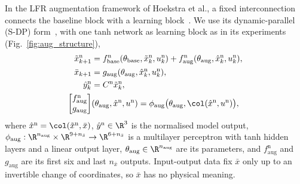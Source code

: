 In the LFR augmentation framework of Hoekstra et al., a fixed interconnection
connects the baseline block with a learning
block~\cite[Sec.~3.2]{hoekstra2025lfr}.
We use its dynamic-parallel (S-DP) form~\cite[Table~1]{hoekstra2026lfr}, with
one tanh network as learning block as in its
experiments~\cite[Sec.~6.3]{hoekstra2026lfr} (Fig.~\ref{fig:aug_structure}),
\begin{equation}
\begin{aligned}
 \tilde x^{\mathrm n}_{k+1}
 &=f^{\mathrm n}_{\mathrm{base}}(\theta_{\mathrm{base}},\tilde x^{\mathrm n}_k,u^{\mathrm n}_k)
  +f^{\mathrm n}_{\mathrm{aug}}(\theta_{\mathrm{aug}},\hat x^{\mathrm n}_k,u^{\mathrm n}_k),\\
 \bar x_{k+1}&=g_{\mathrm{aug}}(\theta_{\mathrm{aug}},\hat x^{\mathrm n}_k,u^{\mathrm n}_k),\\
 \hat y^{\mathrm n}_k&=C^{\mathrm n}\tilde x^{\mathrm n}_k,\\
 \begin{bmatrix}
  f^{\mathrm n}_{\mathrm{aug}}\\ g_{\mathrm{aug}}
 \end{bmatrix}&(\theta_{\mathrm{aug}},\hat x^{\mathrm n},u^{\mathrm n})
 =\phi_{\mathrm{aug}}\bigl(\theta_{\mathrm{aug}},\col(\hat x^{\mathrm n},u^{\mathrm n})\bigr),
\end{aligned}
\label{eq:aug_transition}
\end{equation}
where $\hat x^{\mathrm n}=\col(\tilde x^{\mathrm n},\bar x)$,
$\hat y^{\mathrm n}\in\R^3$ is the normalised model output,
$\phi_{\mathrm{aug}}:\R^{n_{\mathrm{aug}}}\times\R^{9+n_{\bar x}}\to\R^{6+n_{\bar x}}$
is a multilayer perceptron with tanh hidden layers and a linear output layer,
$\theta_{\mathrm{aug}}\in\R^{n_{\mathrm{aug}}}$ are its parameters, and
$f^{\mathrm n}_{\mathrm{aug}}$ and $g_{\mathrm{aug}}$ are its first six and
last $n_{\bar x}$ outputs.
Input-output data fix $\bar x$ only up to an invertible change of
coordinates, so $\bar x$ has no physical meaning.

